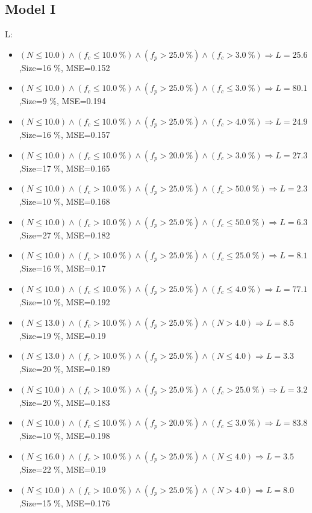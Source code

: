 \documentclass[numbered]{CSL}
\begin{document}
\subsection{Model I}
L:
\begin{itemize}
\item $(N \leq 10.0) \land (f_c \leq 10.0~\%) \land (f_p > 25.0~\%) \land (f_c > 3.0~\%) \Rightarrow L = 25.6$,\hfill Size=16 \%, MSE=0.152
\item $(N \leq 10.0) \land (f_c \leq 10.0~\%) \land (f_p > 25.0~\%) \land (f_c \leq 3.0~\%) \Rightarrow L = 80.1$,\hfill Size=9 \%, MSE=0.194
\item $(N \leq 10.0) \land (f_c \leq 10.0~\%) \land (f_p > 25.0~\%) \land (f_c > 4.0~\%) \Rightarrow L = 24.9$,\hfill Size=16 \%, MSE=0.157
\item $(N \leq 10.0) \land (f_c \leq 10.0~\%) \land (f_p > 20.0~\%) \land (f_c > 3.0~\%) \Rightarrow L = 27.3$,\hfill Size=17 \%, MSE=0.165
\item $(N \leq 10.0) \land (f_c > 10.0~\%) \land (f_p > 25.0~\%) \land (f_c > 50.0~\%) \Rightarrow L = 2.3$,\hfill Size=10 \%, MSE=0.168
\item $(N \leq 10.0) \land (f_c > 10.0~\%) \land (f_p > 25.0~\%) \land (f_c \leq 50.0~\%) \Rightarrow L = 6.3$,\hfill Size=27 \%, MSE=0.182
\item $(N \leq 10.0) \land (f_c > 10.0~\%) \land (f_p > 25.0~\%) \land (f_c \leq 25.0~\%) \Rightarrow L = 8.1$,\hfill Size=16 \%, MSE=0.17
\item $(N \leq 10.0) \land (f_c \leq 10.0~\%) \land (f_p > 25.0~\%) \land (f_c \leq 4.0~\%) \Rightarrow L = 77.1$,\hfill Size=10 \%, MSE=0.192
\item $(N \leq 13.0) \land (f_c > 10.0~\%) \land (f_p > 25.0~\%) \land (N > 4.0) \Rightarrow L = 8.5$,\hfill Size=19 \%, MSE=0.19
\item $(N \leq 13.0) \land (f_c > 10.0~\%) \land (f_p > 25.0~\%) \land (N \leq 4.0) \Rightarrow L = 3.3$,\hfill Size=20 \%, MSE=0.189
\item $(N \leq 10.0) \land (f_c > 10.0~\%) \land (f_p > 25.0~\%) \land (f_c > 25.0~\%) \Rightarrow L = 3.2$,\hfill Size=20 \%, MSE=0.183
\item $(N \leq 10.0) \land (f_c \leq 10.0~\%) \land (f_p > 20.0~\%) \land (f_c \leq 3.0~\%) \Rightarrow L = 83.8$,\hfill Size=10 \%, MSE=0.198
\item $(N \leq 16.0) \land (f_c > 10.0~\%) \land (f_p > 25.0~\%) \land (N \leq 4.0) \Rightarrow L = 3.5$,\hfill Size=22 \%, MSE=0.19
\item $(N \leq 10.0) \land (f_c > 10.0~\%) \land (f_p > 25.0~\%) \land (N > 4.0) \Rightarrow L = 8.0$,\hfill Size=15 \%, MSE=0.176

\end{itemize}
\end{document}
